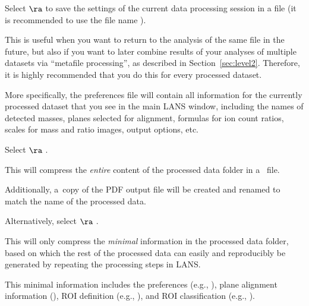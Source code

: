 \s Select  $\ra$  to save the settings of the current data processing session in a file (it is recommended to use the file name ). 

\bul This is useful when you want to return to the analysis of the same file in the future, but also if you want to later combine results of your analyses of multiple datasets via ``metafile processing'', as described in Section~\ref{sec:level2}. Therefore, it is highly recommended that you do this for every processed dataset.

\bul More specifically, the preferences file will contain all information for the currently processed dataset that you see in the main LANS window, including the names of detected masses, planes selected for alignment, formulas for ion count ratios, scales for mass and ratio images, output options, etc.

\s Select  $\ra$ .

\bul This will compress the \emph{entire} content of the processed data folder in a~ file.

\bul Additionally, a~copy of the PDF output file will be created and renamed to match the name of the processed data.

\s Alternatively, select  $\ra$ .

\bul This will only compress the \emph{minimal} information in the processed data folder, based on which the rest of the processed data can easily and reproducibly be generated by repeating the processing steps in LANS. 

\bul This minimal information includes the preferences (e.g., ), plane alignment information (), ROI definition (e.g., ), and ROI classification (e.g., ).

